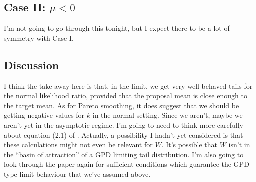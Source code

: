 \documentclass{article}
\begin{document}
\subsection{Case II: $\mu < 0$}

I'm not going to go through this tonight, but I expect there to be a lot of symmetry with Case I.


\subsection{Discussion}

I think the take-away here is that, in the limit, we get very well-behaved tails for the normal likelihood ratio, provided that the proposal mean is close enough to the target mean. As for Pareto smoothing, it does suggest that we should be getting negative values for $k$ in the normal setting. Since we aren't, maybe we aren't yet in the asymptotic regime. I'm going to need to think more carefully about equation (2.1) of \citet{Pic75}. Actually, a possibility I hadn't yet considered is that these calculations might not even be relevant for $W$. It's possible that $W$ isn't in the ``basin of attraction'' of a GPD limiting tail distribution. I'm also going to look through the paper again for sufficient conditions which guarantee the GPD type limit behaviour that we've assumed above.




\end{document}
